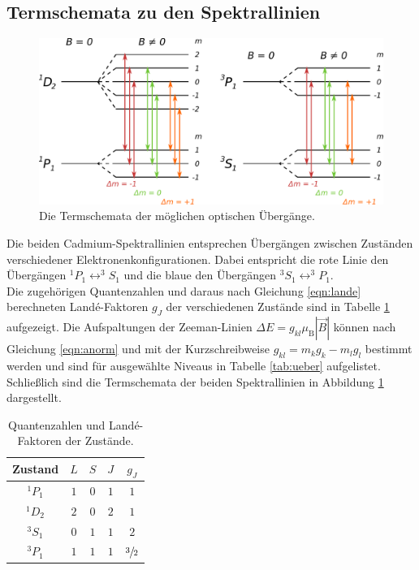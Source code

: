 \subsection{Termschemata zu den Spektrallinien}

\begin{figure}[H]
    \centering
    \includegraphics[scale=0.6]{content/Zeeman.pdf}
    \caption{Die Termschemata der möglichen optischen Übergänge.}
    \label{fig:term}
\end{figure}

Die beiden Cadmium-Spektrallinien entsprechen Übergängen zwischen Zuständen verschiedener Elektronenkonfigurationen.
Dabei entspricht die rote Linie den Übergängen $^1P_1 \leftrightarrow ^3S_1$ und die 
blaue den Übergängen $^3S_1 \leftrightarrow ^3P_1$.\\

Die zugehörigen Quantenzahlen und daraus nach Gleichung \eqref{eqn:lande} berechneten Landé-Faktoren $g_J$ der
verschiedenen Zustände sind in Tabelle \ref{tab:lande} aufgezeigt. 
Die Aufspaltungen der Zeeman-Linien $\Delta E = g_{kl} \mu_\text{B} |\vec{B}|$ können nach Gleichung \eqref{eqn:anorm} und mit der 
Kurzschreibweise $g_{kl} = m_k g_k - m_l g_l$ bestimmt werden und sind für ausgewählte Niveaus in Tabelle \ref{tab:ueber} aufgelistet.
Schließlich sind die Termschemata der beiden Spektrallinien in Abbildung \ref{fig:term} dargestellt.

\vspace{-10pt}
\begin{table}[H]
    \centering
    \caption{Quantenzahlen und Landé-Faktoren der Zustände.}
    \vspace{-5pt}
    \label{tab:lande}
    \begin{tabular}{c|ccc|c}
        \hline 
        Zustand & $L$ & $S$ & $J$ & $g_J$ \\
        \hline
        \hline
        $^1P_1$ & $1$ & $0$ & $1$ & $1$ \\
        $^1D_2$ & $2$ & $0$ & $2$ & $1$ \\
        $^3S_1$ & $0$ & $1$ & $1$ & $2$ \\ 
        $^3P_1$ & $1$ & $1$ & $1$ & $\sfrac{3}{2}$ \\
        \hline 
    \end{tabular}
\end{table}

